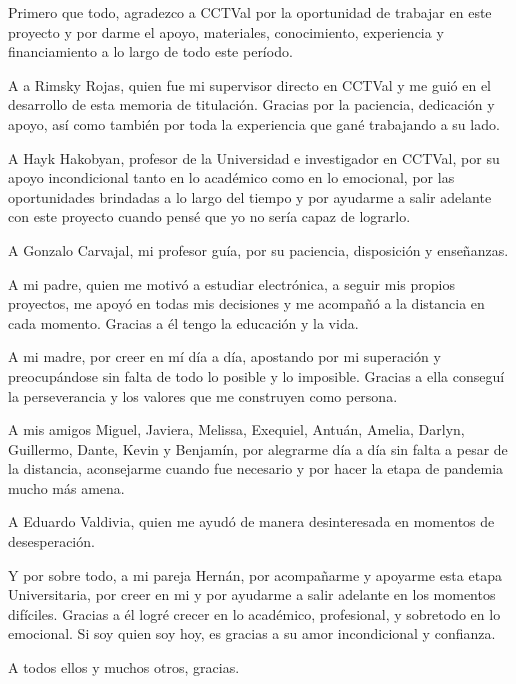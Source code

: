 
Primero que todo, agradezco a CCTVal por la oportunidad de trabajar en este proyecto y por darme el apoyo, materiales, conocimiento, experiencia y financiamiento a lo largo de todo este período.

A a Rimsky Rojas, quien fue mi supervisor directo en CCTVal y me guió en el desarrollo de esta memoria de titulación. Gracias por la paciencia, dedicación y apoyo, así como también por toda la experiencia que gané trabajando a su lado.
 
A Hayk Hakobyan, profesor de la Universidad e investigador en CCTVal, por su apoyo incondicional tanto en lo académico como en lo emocional, por las oportunidades brindadas a lo largo del tiempo y por ayudarme a salir adelante con este proyecto cuando pensé que yo no sería capaz de lograrlo.

A Gonzalo Carvajal, mi profesor guía, por su paciencia, disposición y enseñanzas.

A mi padre, quien me motivó a estudiar electrónica, a seguir mis propios proyectos, me apoyó en todas mis decisiones y me acompañó a la distancia en cada momento. Gracias a él tengo la educación y la vida.

A mi madre, por creer en mí día a día, apostando por mi superación y preocupándose sin falta de todo lo posible y lo imposible. Gracias a ella conseguí la perseverancia y los valores que me construyen como persona. 

A mis amigos Miguel, Javiera, Melissa, Exequiel, Antuán,  Amelia, Darlyn, Guillermo, Dante, Kevin y Benjamín, por alegrarme día a día sin falta a pesar de la distancia, aconsejarme cuando fue necesario y por hacer la etapa de pandemia mucho más amena. 

A Eduardo Valdivia, quien me ayudó de manera desinteresada en momentos de desesperación.

Y por sobre todo, a mi pareja Hernán, por acompañarme y apoyarme esta etapa Universitaria, por creer en mi y por ayudarme a salir adelante en los momentos difíciles. Gracias a él logré crecer en lo académico, profesional, y sobretodo en lo emocional. Si soy quien soy hoy, es gracias a su amor incondicional y confianza.

\begin{flushright}
	A todos ellos y muchos otros, gracias.
\end{flushright}
